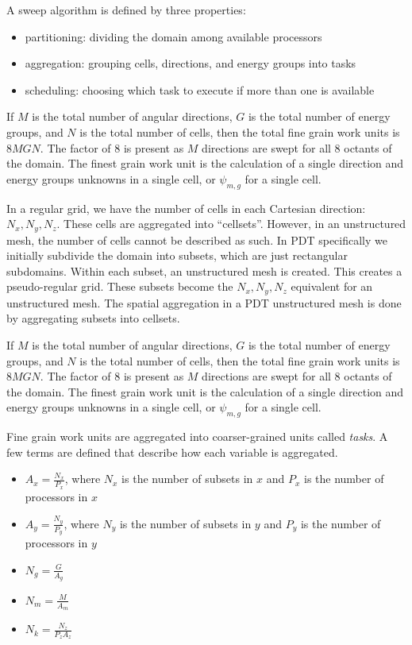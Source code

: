 \documentclass[11pt, letterpaper,titlepage,oneside]{article}
\begin{document}
A sweep algorithm is defined by three properties:

\begin{itemize}
\item partitioning: dividing the domain among available processors
\item aggregation: grouping cells, directions, and energy groups into tasks
\item scheduling: choosing which task to execute if more than one is available
\end{itemize}

If $M$ is the total number of angular directions, $G$ is the total number of energy groups, and $N$ is the total number of cells, then the total fine grain work units is $8MGN$. The factor of 8 is present as $M$ directions are swept for all 8 octants of the domain. The finest grain work unit is the calculation of a single direction and energy groups unknowns in a single cell, or $\psi_{m,g}$ for a single cell.

In a regular grid, we have the  number of cells in each Cartesian direction: $N_x, N_y, N_z$. These cells are aggregated into ``cellsets''. However, in an unstructured mesh, the number of cells cannot be described as such. In PDT specifically we initially subdivide the domain into subsets, which are just rectangular subdomains. Within each subset, an unstructured mesh is created. This creates a pseudo-regular grid. These subsets become the $N_x, N_y, N_z$ equivalent for an unstructured mesh. The spatial aggregation in a PDT unstructured mesh is done by aggregating subsets into cellsets. 

If $M$ is the total number of angular directions, $G$ is the total number of energy groups, and $N$ is the total number of cells, then the total fine grain work units is $8MGN$. The factor of 8 is present as $M$ directions are swept for all 8 octants of the domain. The finest grain work unit is the calculation of a single direction and energy groups unknowns in a single cell, or $\psi_{m,g}$ for a single cell.

Fine grain work units are aggregated into coarser-grained units called \textit{tasks}. A few terms are defined that describe how each variable is aggregated.

\begin{itemize}
\item $A_x = \frac{N_x}{P_x}$, where $N_x$ is the number of subsets in $x$ and $P_x$ is the number of processors in $x$
\item $A_y = \frac{N_y}{P_y}$, where $N_y$ is the number of subsets in $y$ and $P_y$ is the number of processors in $y$
\item $N_g = \frac{G}{A_g}$
\item $N_m = \frac{M}{A_m}$
\item $N_k = \frac{N_z}{P_z A_z}$
\end{itemize}
\end{document}
